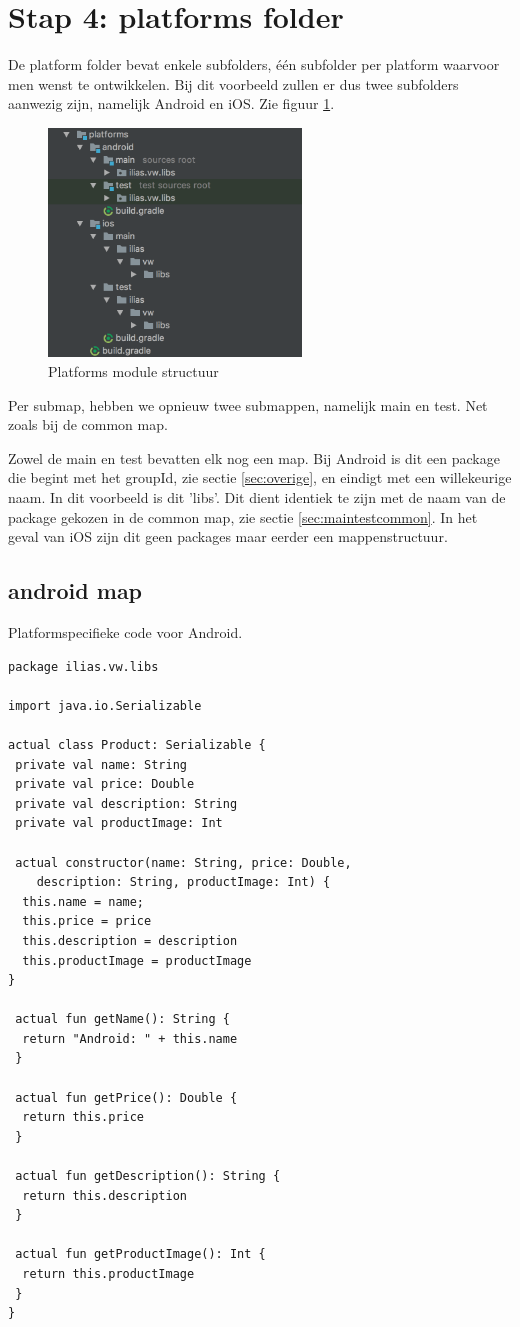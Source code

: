 \section{Stap 4: platforms folder}
De platform folder bevat enkele subfolders, één subfolder per platform waarvoor men wenst te ontwikkelen. Bij dit voorbeeld zullen er dus twee subfolders aanwezig zijn, namelijk Android en iOS. Zie figuur \ref{fig:stap4-structuur}.

\begin{figure} [ht]
	\centering
	\includegraphics[width=0.60\textwidth]{img/stap4-structuur.png}
	\caption{Platforms module structuur}
	\label{fig:stap4-structuur}
\end{figure}

Per submap, hebben we opnieuw twee submappen, namelijk main en test. Net zoals bij de common map. 

Zowel de main en test bevatten elk nog een map. Bij Android is dit een package die begint met het groupId, zie sectie \ref{sec:overige}, en eindigt met een willekeurige naam. In dit voorbeeld is dit 'libs'. Dit dient identiek te zijn met de naam van de package gekozen in de common map, zie sectie \ref{sec:maintestcommon}. In het geval van iOS zijn dit geen packages maar eerder een mappenstructuur.

\subsection{android map}
Platformspecifieke code voor Android.
\begin{lstlisting}
package ilias.vw.libs

import java.io.Serializable

actual class Product: Serializable {
 private val name: String
 private val price: Double
 private val description: String
 private val productImage: Int

 actual constructor(name: String, price: Double, 
 	description: String, productImage: Int) {
  this.name = name;
  this.price = price
  this.description = description
  this.productImage = productImage
}

 actual fun getName(): String {
  return "Android: " + this.name
 }

 actual fun getPrice(): Double {
  return this.price
 }

 actual fun getDescription(): String {
  return this.description
 }

 actual fun getProductImage(): Int {
  return this.productImage
 }
}
\end{lstlisting}

